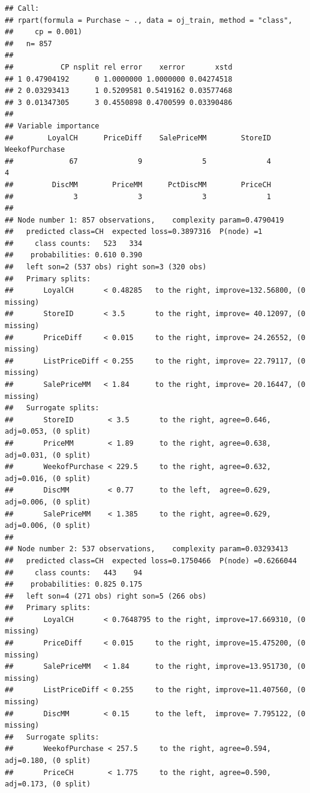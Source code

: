 \documentclass[
]{book}
\begin{document}
\begin{verbatim}
## Call:
## rpart(formula = Purchase ~ ., data = oj_train, method = "class", 
##     cp = 0.001)
##   n= 857 
## 
##           CP nsplit rel error    xerror       xstd
## 1 0.47904192      0 1.0000000 1.0000000 0.04274518
## 2 0.03293413      1 0.5209581 0.5419162 0.03577468
## 3 0.01347305      3 0.4550898 0.4700599 0.03390486
## 
## Variable importance
##        LoyalCH      PriceDiff    SalePriceMM        StoreID WeekofPurchase 
##             67              9              5              4              4 
##         DiscMM        PriceMM      PctDiscMM        PriceCH 
##              3              3              3              1 
## 
## Node number 1: 857 observations,    complexity param=0.4790419
##   predicted class=CH  expected loss=0.3897316  P(node) =1
##     class counts:   523   334
##    probabilities: 0.610 0.390 
##   left son=2 (537 obs) right son=3 (320 obs)
##   Primary splits:
##       LoyalCH       < 0.48285   to the right, improve=132.56800, (0 missing)
##       StoreID       < 3.5       to the right, improve= 40.12097, (0 missing)
##       PriceDiff     < 0.015     to the right, improve= 24.26552, (0 missing)
##       ListPriceDiff < 0.255     to the right, improve= 22.79117, (0 missing)
##       SalePriceMM   < 1.84      to the right, improve= 20.16447, (0 missing)
##   Surrogate splits:
##       StoreID        < 3.5       to the right, agree=0.646, adj=0.053, (0 split)
##       PriceMM        < 1.89      to the right, agree=0.638, adj=0.031, (0 split)
##       WeekofPurchase < 229.5     to the right, agree=0.632, adj=0.016, (0 split)
##       DiscMM         < 0.77      to the left,  agree=0.629, adj=0.006, (0 split)
##       SalePriceMM    < 1.385     to the right, agree=0.629, adj=0.006, (0 split)
## 
## Node number 2: 537 observations,    complexity param=0.03293413
##   predicted class=CH  expected loss=0.1750466  P(node) =0.6266044
##     class counts:   443    94
##    probabilities: 0.825 0.175 
##   left son=4 (271 obs) right son=5 (266 obs)
##   Primary splits:
##       LoyalCH       < 0.7648795 to the right, improve=17.669310, (0 missing)
##       PriceDiff     < 0.015     to the right, improve=15.475200, (0 missing)
##       SalePriceMM   < 1.84      to the right, improve=13.951730, (0 missing)
##       ListPriceDiff < 0.255     to the right, improve=11.407560, (0 missing)
##       DiscMM        < 0.15      to the left,  improve= 7.795122, (0 missing)
##   Surrogate splits:
##       WeekofPurchase < 257.5     to the right, agree=0.594, adj=0.180, (0 split)
##       PriceCH        < 1.775     to the right, agree=0.590, adj=0.173, (0 split)

\end{verbatim}
\end{document}
